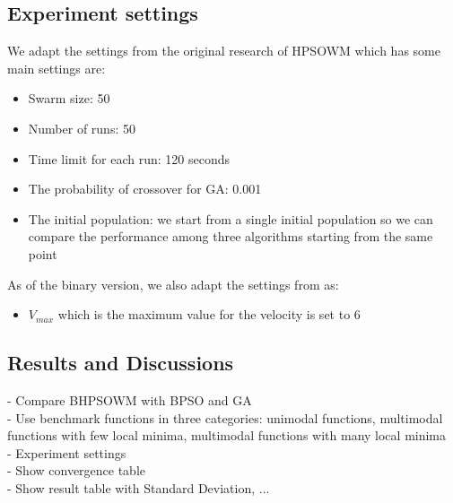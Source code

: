 \subsection{Experiment settings}
We adapt the settings from the original research of HPSOWM \cite{ling2008hybrid} which has some main settings are:
\begin{itemize}
	\item Swarm size: 50
	\item Number of runs: 50
	\item Time limit for each run: 120 seconds
	\item The probability of crossover for GA: 0.001
	\item The initial population: we start from a single initial population so we can compare the performance among three algorithms starting from the same point
\end{itemize}
As of the binary version, we also adapt the settings from \cite{kennedy1997discrete} as:
\begin{itemize}
	\item $V_{max}$ which is the maximum value for the velocity is set to 6
\end{itemize}

\subsection{Results and Discussions}

- Compare BHPSOWM with BPSO and GA \\
- Use benchmark functions in three categories: unimodal functions, multimodal functions with few local minima, multimodal functions with many local minima \\
- Experiment settings \\
- Show convergence table \\
- Show result table with Standard Deviation, ... \\



